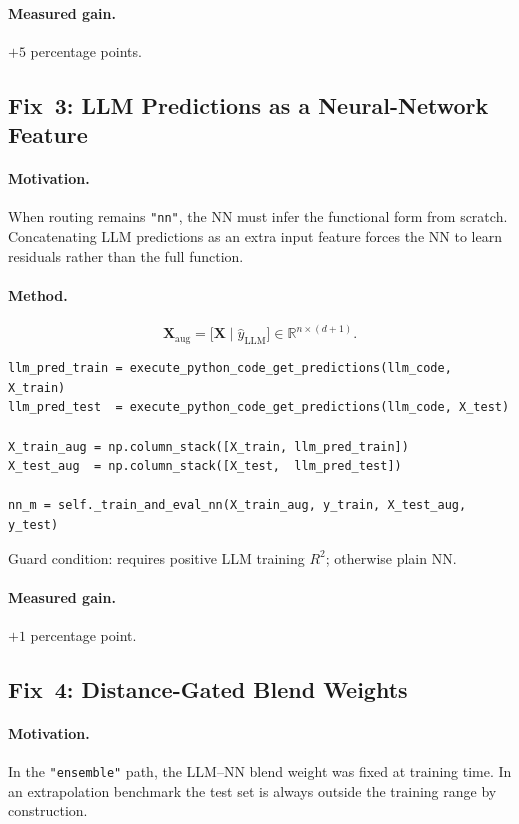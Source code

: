 \documentclass[twoside,11pt]{article}
\begin{document}
\paragraph{Measured gain.} $+5$ percentage points.

\subsection{Fix~3: LLM Predictions as a Neural-Network Feature}

\paragraph{Motivation.}
When routing remains \texttt{"nn"}, the NN must infer the functional form from
scratch.  Concatenating LLM predictions as an extra input feature forces the
NN to learn residuals rather than the full function.

\paragraph{Method.}

\[
  \mathbf{X}_{\text{aug}}
  = \bigl[\mathbf{X} \;\big|\; \hat{y}_{\text{LLM}}\bigr]
  \in \mathbb{R}^{n \times (d+1)}.
\]

\begin{lstlisting}[caption={LLM-feature augmentation.}]
llm_pred_train = execute_python_code_get_predictions(llm_code, X_train)
llm_pred_test  = execute_python_code_get_predictions(llm_code, X_test)

X_train_aug = np.column_stack([X_train, llm_pred_train])
X_test_aug  = np.column_stack([X_test,  llm_pred_test])

nn_m = self._train_and_eval_nn(X_train_aug, y_train, X_test_aug, y_test)
\end{lstlisting}

Guard condition: requires positive LLM training $R^2$; otherwise plain NN.

\paragraph{Measured gain.} $+1$ percentage point.

\subsection{Fix~4: Distance-Gated Blend Weights}

\paragraph{Motivation.}
In the \texttt{"ensemble"} path, the LLM--NN blend weight was fixed at training
time.  In an extrapolation benchmark the test set is always outside the
training range by construction.
\end{document}
